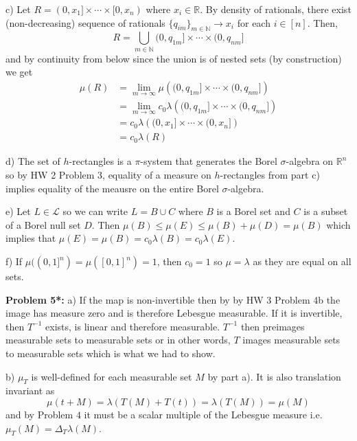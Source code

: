 \documentclass[12pt]{amsart} %
\def\N{\mathbb{N}}
\def\R{\mathbb{R}}
\def\la{\lambda}
\begin{document}
\smallskip
c) Let $R = (0, x_1] \times \cdots \times [0, x_n)$ where  $x_i \in \R$. By density of rationals, there exist (non-decreasing) sequence of rationals $\{q_{im}\}_{m \in \N} \to x_i$ for each $i \in [n]$. Then, $$R = \bigcup_{m \in \N} (0, q_{1m}] \times \cdots \times (0, q_{nm}]$$ and by continuity from below since the union is of nested sets (by construction) we get 
\begin{align*}
	\mu(R) &= \lim_{m \to \infty} \mu\left( (0, q_{1m}] \times \cdots \times (0, q_{nm}] \right) \\
	       &=  \lim_{m \to \infty} c_0 \lambda\left( (0, q_{1m}] \times \cdots \times (0, q_{nm}] \right) 	\\
	       &= c_0 \lambda\left( (0, x_1] \times \cdots \times (0, x_n] \right) \\
	       &= c_0\lambda(R)
\end{align*}


\smallskip
d) The set of $h$-rectangles is a $\pi$-system that generates the Borel $\sigma$-algebra on $\R^n$ so by HW 2 Problem 3, equality of a measure on $h$-rectangles from part c) implies equality of the meausre on the entire Borel $\sigma$-algebra. 

\smallskip
e) Let $L \in \mathcal{L}$ so we can write $L = B \cup C$ where  $B$ is a Borel set and  $C$ is a subset of a Borel null set $D$. Then  $\mu(B) \le \mu(E) \le \mu(B) + \mu(D) = \mu(B)$ which implies that $\mu(E) = \mu(B) = c_0 \lambda(B) = c_0 \lambda(E).$

\smallskip
f) If $\mu((0,1]^n) = \mu([0,1]^n)=1$, then $c_0 = 1$ so $\mu=\la$ as they are equal on all sets. 










\bigskip
\noindent
\textbf{Problem 5*:}\smallskip 
a) If the map is non-invertible then by by HW 3 Problem 4b the image has measure zero and is therefore Lebesgue measurable. If it is invertible, then $T^{-1}$ exists, is linear and therefore measurable.  $T^{-1}$ then preimages measurable sets to measurable sets or in other words,  $T$ images measurable sets to measurable sets which is what we had to show.  

\smallskip 
b)  $\mu_T$ is well-defined for each measurable set $M$ by part a). It is also translation invariant as $$
\mu(t+M) = \lambda\left( T(M) + T(t) \right) = \lambda(T(M)) = \mu(M)
$$ and by Problem $4$ it must be a scalar multiple of the Lebesgue measure i.e.  $\mu_T(M) = \Delta_T \lambda(M)$. 
  
\end{document}
